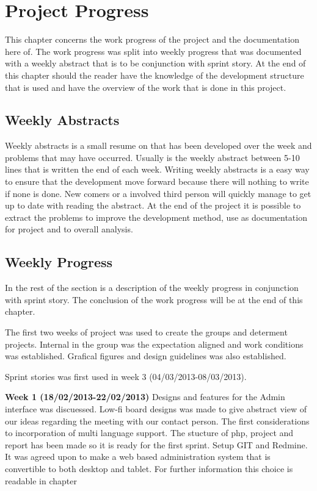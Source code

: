 \chapter{Project Progress}
\label{sec:projectProgress}
This chapter concerns the work progress of the project and the documentation here of. 
The work progress was split into weekly progress that was documented with a weekly abstract that is to be conjunction with sprint story.  
At the end of this chapter should the reader have the knowledge of the development structure that is used and have the overview of the work that is done in this project. 


\section{Weekly Abstracts}      
\label{subsec:weeklyAbstracts}
Weekly abstracts is a small resume on that has been developed over the week and problems that may have occurred. 
Usually is the weekly abstract between 5-10 lines that is written the end of each week. 
Writing weekly abstracts is a easy way to ensure that the development move forward because there will nothing to write if none is done.
New comers or a involved third person will quickly manage to get up to date with reading the abstract. 
At the end of the project it is possible to extract the problems to improve the development method, use as documentation for project and to overall analysis.          

\section{Weekly Progress}
\label{subsec:weeklyProgress}
In the rest of the section is a description of the weekly progress in conjunction with sprint story.
The conclusion of the work progress will be at the end of this chapter. 

The first two weeks of project was used to create the groups and determent projects.  
Internal in the group was the expectation aligned and work conditions was established.
Grafical figures and design guidelines was also established.      

Sprint stories was first used in week 3 (04/03/2013-08/03/2013).   

\textbf{Week 1 (18/02/2013-22/02/2013)} 
Designs and features for the Admin interface was discuessed.
Low-fi board designs was made to give abstract view of our ideas regarding the meeting with our contact person.   
The first considerations to incorporation of multi language support.
The stucture of php, project and report has been made so it is ready for the first sprint.
Setup GIT and Redmine.
It was agreed upon to make a web based administration system that is convertible to both desktop and tablet.  
For further information this choice is readable in chapter  

